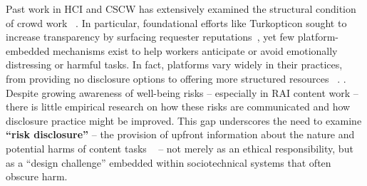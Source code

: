 Past work in HCI and CSCW has extensively examined the structural condition of crowd work ~\cite{gray2016crowd, silberman2018responsible,salehi2015we}. In particular, foundational efforts like Turkopticon sought to increase transparency by surfacing requester reputations~\cite{irani2013turkopticon}, yet few platform-embedded mechanisms exist to help workers anticipate or avoid emotionally distressing or harmful tasks. In fact, platforms vary widely in their practices, from providing no disclosure options to offering more structured resources ~\cite{prolific2025participant, prolific2025sensitive, ProlificAPIContentWarning2025}. . Despite growing awareness of well-being risks -- especially in RAI content work -- there is little empirical research on how these risks are communicated and how disclosure practice might be improved. This gap underscores the need to examine \textbf{``risk disclosure''} -- the provision of upfront information about the
nature and potential harms of content tasks ~\cite{bharucha2023content, qian2025aura} -- not merely as an ethical responsibility, but as a ``design challenge'' embedded within sociotechnical systems that often obscure harm.


